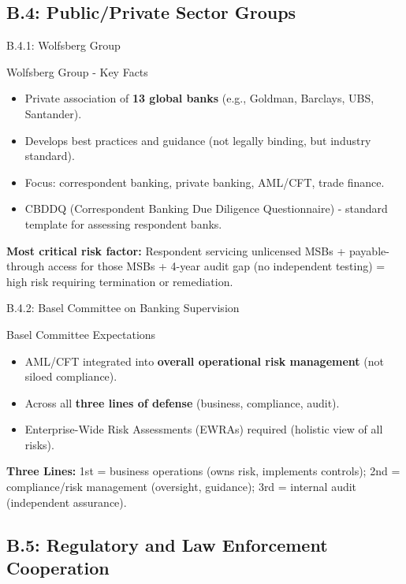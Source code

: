 \documentclass{beamer}
\begin{document}
	\subsection{B.4: Public/Private Sector Groups}
	
	\begin{frame}{B.4.1: Wolfsberg Group}
		\begin{block}{Wolfsberg Group - Key Facts}
			\begin{itemize}
				\item Private association of \textbf{13 global banks} (e.g., Goldman, Barclays, UBS, Santander).
				\item Develops best practices and guidance (not legally binding, but industry standard).
				\item Focus: correspondent banking, private banking, AML/CFT, trade finance.
				\item CBDDQ (Correspondent Banking Due Diligence Questionnaire) - standard template for assessing respondent banks.
			\end{itemize}
		\end{block}
		\textbf{Most critical risk factor:} Respondent servicing unlicensed MSBs + payable-through access for those MSBs + 4-year audit gap (no independent testing) = high risk requiring termination or remediation.
	\end{frame}
	
	\begin{frame}{B.4.2: Basel Committee on Banking Supervision}
		\begin{block}{Basel Committee Expectations}
			\begin{itemize}
				\item AML/CFT integrated into \textbf{overall operational risk management} (not siloed compliance).
				\item Across all \textbf{three lines of defense} (business, compliance, audit).
				\item Enterprise-Wide Risk Assessments (EWRAs) required (holistic view of all risks).
			\end{itemize}
		\end{block}
		\textbf{Three Lines:} 1st = business operations (owns risk, implements controls); 2nd = compliance/risk management (oversight, guidance); 3rd = internal audit (independent assurance).
	\end{frame}
	
	\subsection{B.5: Regulatory and Law Enforcement Cooperation}
	
\end{document}
